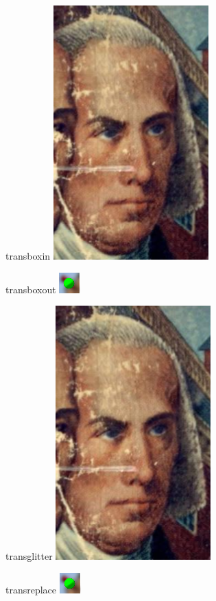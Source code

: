 \documentclass{beamer}
\begin{document}
\begin{frame}{transboxin}
    \transboxin
    \includegraphics{a.png}
\end{frame}

\begin{frame}{transboxout}
    \transboxout
    \includegraphics{b.png}
\end{frame}

\begin{frame}{transglitter}
    \transglitter
    \includegraphics{a.png}
\end{frame}

\begin{frame}{transreplace}
    \includegraphics{b.png}
\end{frame}
\end{document}
